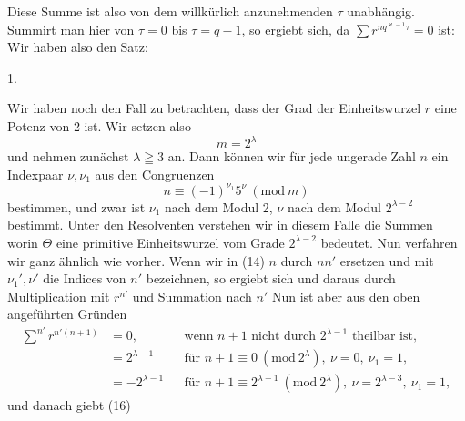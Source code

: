 Diese Summe ist also von dem willkürlich anzunehmenden $\tau$ unabhängig. Summirt man hier von $\tau=0$ bis $\tau=q-1$, so ergiebt sich, da $\sum r^{n q^{\varkappa-1}\tau}=0$ ist:
Wir haben also den Satz:

1.~

Wir haben noch den Fall zu betrachten, dass der Grad der Einheitswurzel $r$ eine Potenz von 2 ist. Wir setzen also
\[
m = 2^\lambda
\]
und nehmen zunächst $\lambda \geqq 3$ an. Dann können wir für jede ungerade Zahl $n$ ein Indexpaar $\nu, \nu_1$ aus den Congruenzen
\[
n \equiv (-1)^{\nu_1} 5^\nu\ (\mathrm{mod}\ m)
\]
bestimmen, und zwar ist $\nu_1$ nach dem Modul 2, $\nu$ nach dem Modul $2^{\lambda-2}$ bestimmt. Unter den Resolventen verstehen wir in diesem Falle die Summen
worin $\Theta$ eine primitive Einheitswurzel vom Grade $2^{\lambda-2}$ bedeutet. Nun verfahren wir ganz ähnlich wie vorher. Wenn wir in (14) $n$ durch $nn'$ ersetzen und mit $\nu_1', \nu'$ die Indices von $n'$ bezeichnen, so ergiebt sich
und daraus durch Multiplication mit $r^{n'}$ und Summation nach $n'$
Nun ist aber aus den oben angeführten Gründen
\[
\begin{aligned}
\sum^{n'} r^{n'(n+1)} &= 0, & &\text{wenn } n+1 \text{ nicht durch } 2^{\lambda-1} \text{ theilbar ist,} \\
&= 2^{\lambda-1} & &\text{für } n+1 \equiv 0\ (\mathrm{mod}\ 2^\lambda),\ \nu=0,\ \nu_1=1, \\
&= -2^{\lambda-1} & &\text{für } n+1 \equiv 2^{\lambda-1}\ (\mathrm{mod}\ 2^\lambda),\ \nu=2^{\lambda-3},\ \nu_1=1,
\end{aligned}
\]
und danach giebt (16)
